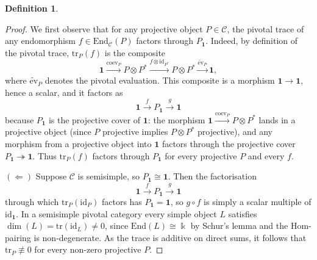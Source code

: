 \documentclass[11pt]{article}
\theoremstyle{definition}
\newtheorem{definition}[theorem]{Definition}
\begin{document}
\begin{definition}
\begin{proof}
We first observe that for any projective object $P \in \mathcal{C}$, the pivotal trace of
any endomorphism $f \in \mathrm{End}_{\mathcal{C}}(P)$ factors through $P_{\mathbf{1}}$. Indeed, by
definition of the pivotal trace, $\mathrm{tr}_{P}(f)$ is the composite
\[
\mathbf{1}
\xrightarrow{\mathrm{coev}_{P}}
P \otimes P^{*}
\xrightarrow{f \otimes \mathrm{id}_{P^{*}}}
P \otimes P^{*}
\xrightarrow{\widetilde{\mathrm{ev}}_{P}}
\mathbf{1},
\]
where $\widetilde{\mathrm{ev}}_{P}$ denotes the pivotal evaluation. This composite is a
morphism $\mathbf{1} \to \mathbf{1}$, hence a scalar, and it factors as
\[
\mathbf{1} \xrightarrow{f} P_{\mathbf{1}} \xrightarrow{g} \mathbf{1}
\]
because $P_{\mathbf{1}}$ is the projective cover of $\mathbf{1}$: the morphism
$\mathbf{1} \xrightarrow{\mathrm{coev}_{P}} P \otimes P^{*}$ lands in a projective object
(since $P$ projective implies $P \otimes P^{*}$ projective), and any morphism from a
projective object into $\mathbf{1}$ factors through the projective cover
$P_{\mathbf{1}} \twoheadrightarrow \mathbf{1}$. Thus $\mathrm{tr}_{P}(f)$ factors through
$P_{\mathbf{1}}$ for every projective $P$ and every $f$.

\medskip

$(\Leftarrow)$ Suppose $\mathcal{C}$ is semisimple, so $P_{\mathbf{1}} \cong \mathbf{1}$.
Then the factorisation
\[
\mathbf{1} \xrightarrow{f} P_{\mathbf{1}} \xrightarrow{g} \mathbf{1}
\]
through which $\mathrm{tr}_{P}(\mathrm{id}_{P})$ factors has $P_{\mathbf{1}} = \mathbf{1}$,
so $g \circ f$ is simply a scalar multiple of $\mathrm{id}_{\mathbf{1}}$. In a semisimple
pivotal category every simple object $L$ satisfies
$\dim(L) = \mathrm{tr}(\mathrm{id}_{L}) \neq 0$, since $\mathrm{End}(L) \cong \Bbbk$ by
Schur's lemma and the Hom-pairing is non-degenerate. As the trace is additive on
direct sums, it follows that $\mathrm{tr}_{P} \not\equiv 0$ for every non-zero
projective $P$.

\medskip


\end{proof}
\end{definition}
\end{document}
